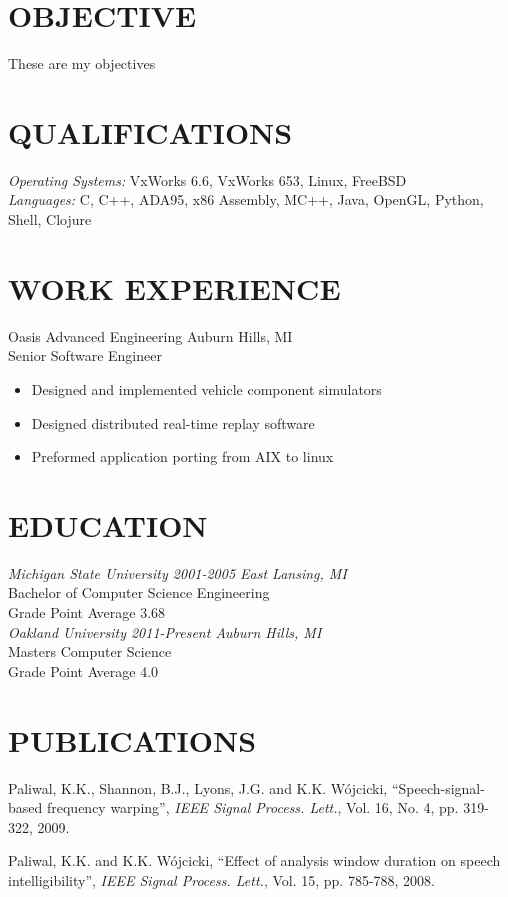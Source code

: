 \documentclass[line]{res}
\begin{document}
\address{724 East 2nd St, Royal Oak, MI 48067}
\address{mathew.prokos@gmail.com}

\begin{resume}
\section{OBJECTIVE}
    These are my objectives
\section{QUALIFICATIONS}
    {\sl Operating Systems:} VxWorks 6.6, VxWorks 653, Linux, FreeBSD\\
    {\sl Languages:} C, C++, ADA95, x86 Assembly, MC++, Java, OpenGL, Python, Shell, Clojure 
\section{WORK EXPERIENCE}
    Oasis Advanced Engineering \hfill Auburn Hills, MI\\
    Senior Software Engineer
    \begin{itemize} 
    \item Designed and implemented vehicle component simulators
    \item Designed distributed real-time replay software
    \item Preformed application porting from AIX to linux
    \end{itemize}
\section{EDUCATION} 
    {\sl Michigan State University 2001-2005 \hfill East Lansing, MI}\\
    Bachelor of Computer Science Engineering\\
    Grade Point Average 3.68\\
    {\sl Oakland University 2011-Present \hfill Auburn Hills, MI}\\
    Masters Computer Science\\
    Grade Point Average 4.0
\section{PUBLICATIONS} 
    Paliwal, K.K., Shannon, B.J., Lyons, J.G. and K.K. W\'ojcicki,
    ``Speech-signal-based frequency warping'',
    \textsl{IEEE Signal Process. Lett.}, Vol. 16, No. 4, pp. 319-322, 2009.

\vspace{-2mm}
    Paliwal, K.K. and K.K. W\'ojcicki,
    ``Effect of analysis window duration on speech intelligibility'',
    \textsl{IEEE Signal Process. Lett.}, Vol. 15, pp. 785-788, 2008.

\end{resume}
\end{document}
